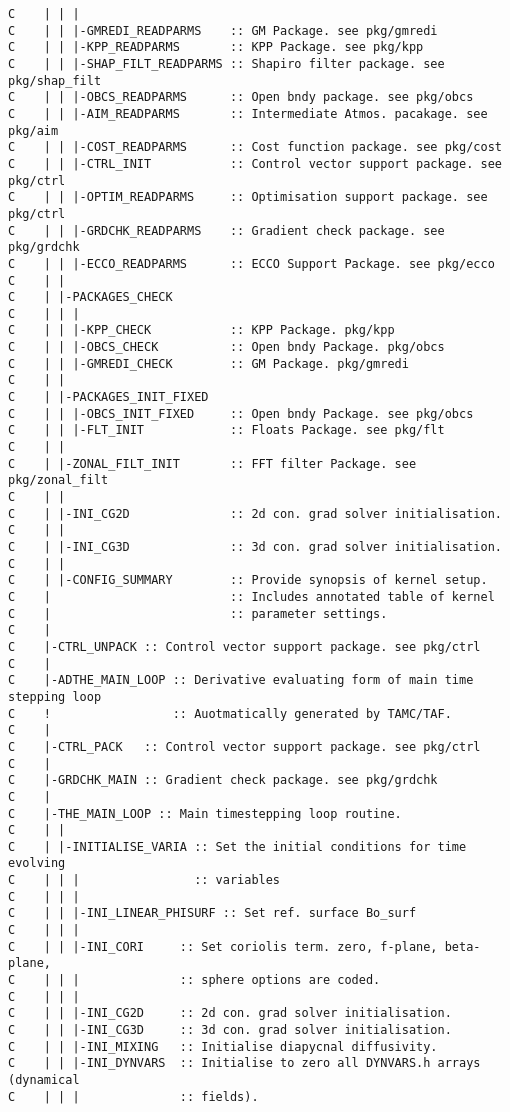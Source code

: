 \begin{verbatim}
C    | | |
C    | | |-GMREDI_READPARMS    :: GM Package. see pkg/gmredi
C    | | |-KPP_READPARMS       :: KPP Package. see pkg/kpp
C    | | |-SHAP_FILT_READPARMS :: Shapiro filter package. see pkg/shap_filt
C    | | |-OBCS_READPARMS      :: Open bndy package. see pkg/obcs
C    | | |-AIM_READPARMS       :: Intermediate Atmos. pacakage. see pkg/aim
C    | | |-COST_READPARMS      :: Cost function package. see pkg/cost
C    | | |-CTRL_INIT           :: Control vector support package. see pkg/ctrl
C    | | |-OPTIM_READPARMS     :: Optimisation support package. see pkg/ctrl 
C    | | |-GRDCHK_READPARMS    :: Gradient check package. see pkg/grdchk
C    | | |-ECCO_READPARMS      :: ECCO Support Package. see pkg/ecco
C    | |
C    | |-PACKAGES_CHECK
C    | | |
C    | | |-KPP_CHECK           :: KPP Package. pkg/kpp
C    | | |-OBCS_CHECK          :: Open bndy Package. pkg/obcs
C    | | |-GMREDI_CHECK        :: GM Package. pkg/gmredi
C    | |
C    | |-PACKAGES_INIT_FIXED
C    | | |-OBCS_INIT_FIXED     :: Open bndy Package. see pkg/obcs
C    | | |-FLT_INIT            :: Floats Package. see pkg/flt
C    | |
C    | |-ZONAL_FILT_INIT       :: FFT filter Package. see pkg/zonal_filt
C    | |
C    | |-INI_CG2D              :: 2d con. grad solver initialisation.
C    | |
C    | |-INI_CG3D              :: 3d con. grad solver initialisation.
C    | |
C    | |-CONFIG_SUMMARY        :: Provide synopsis of kernel setup.
C    |                         :: Includes annotated table of kernel 
C    |                         :: parameter settings.
C    |
C    |-CTRL_UNPACK :: Control vector support package. see pkg/ctrl
C    |
C    |-ADTHE_MAIN_LOOP :: Derivative evaluating form of main time stepping loop
C    !                 :: Auotmatically generated by TAMC/TAF.
C    |
C    |-CTRL_PACK   :: Control vector support package. see pkg/ctrl
C    |
C    |-GRDCHK_MAIN :: Gradient check package. see pkg/grdchk
C    |
C    |-THE_MAIN_LOOP :: Main timestepping loop routine.
C    | |
C    | |-INITIALISE_VARIA :: Set the initial conditions for time evolving 
C    | | |                :: variables
C    | | |
C    | | |-INI_LINEAR_PHISURF :: Set ref. surface Bo_surf
C    | | |
C    | | |-INI_CORI     :: Set coriolis term. zero, f-plane, beta-plane,
C    | | |              :: sphere options are coded.
C    | | |
C    | | |-INI_CG2D     :: 2d con. grad solver initialisation.
C    | | |-INI_CG3D     :: 3d con. grad solver initialisation.
C    | | |-INI_MIXING   :: Initialise diapycnal diffusivity.
C    | | |-INI_DYNVARS  :: Initialise to zero all DYNVARS.h arrays (dynamical
C    | | |              :: fields).

\end{verbatim}
